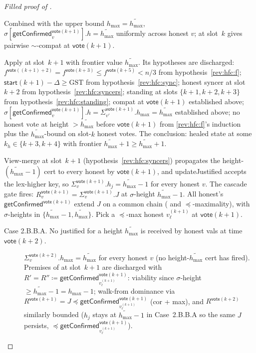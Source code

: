 \ifx\litemode\undefined\documentclass{article}\fi
\newcommand{\hmax}{\ensuremath{h_{\max}}\xspace}
\newcommand{\start}{\ensuremath{\mathsf{start}}}
\newcommand{\vote}{\ensuremath{\mathsf{vote}}}
\newcommand{\GST}{\ensuremath{\mathrm{GST}}\xspace}
\newcommand{\comm}[1]{\ensuremath{\widetilde{#1}}}
\newcommand{\updateJustified}{\textsf{updateJustified}\xspace}
\newcommand{\getConfirmed}{\textsf{getConfirmed}\xspace}
\theoremstyle{plain}
\theoremstyle{definition}
\theoremstyle{remark}
\begin{document}
\begin{proof}[Filled proof of ]
\begin{description}[style=nextline]
\begin{description}[style=nextline]
\begin{description}[style=nextline]
        Combined with the upper bound $\hmax = \comm{\hmax}$, $\sigma[\getConfirmed_v^{\vote(k+1)}].h = \comm{\hmax}$ uniformly across honest $v$;
         at slot~$k$ gives pairwise $\sim$-compat at $\vote(k+1)$.

        Apply  at slot~$k+1$ with frontier value $\comm{\hmax}$.
        Its hypotheses are discharged: $f^{\vote((k+1)+2)} = f^{\vote(k+3)} \leq f^{\vote(k+5)} < n/3$ from hypothesis~\ref{rev:hfc:f};
        $\start(k+1) - \Delta \geq \GST$ from hypothesis~\ref{rev:hfc:sync};
        honest syncer at slot~$k+2$ from hypothesis~\ref{rev:hfc:syncers};
        standing at slots $\{k+1, k+2, k+3\}$ from hypothesis~\ref{rev:hfc:standing};
        compat at $\vote(k+1)$ established above;
        $\sigma[\getConfirmed_v^{\vote(k+1)}].h = \Sigma_{v'}^{\vote(k+1)}.\hmax = \comm{\hmax}$ established above;
        no honest vote at height $> \comm{\hmax}$ before $\vote(k+1)$ from \ref{rev:hfc:f}'s induction plus the $\comm{\hmax}$-bound on slot-$k$ honest votes.
        The conclusion: healed state at some $k_h \in \{k+3, k+4\}$ with frontier $\comm{\hmax}+1 \geq \comm{\hmax}+1$.

      \item[Case 2.B.B. A justified for a height $\comm{\hmax}-1$ is received by honest vals at time $\vote(k+1)$.]
        View-merge at slot~$k+1$ (hypothesis~\ref{rev:hfc:syncers}) propagates the height-$(\comm{\hmax}-1)$ cert to every honest by $\vote(k+1)$, and \updateJustified{} accepts the lex-higher key, so $\Sigma_v^{\vote(k+1)}.h_j = \comm{\hmax}-1$ for every honest $v$.
        The cascade gate fires: $R_v^{\vote(k+1)} = \Sigma_v^{\vote(k+1)}.J$ at $\sigma$-height $\comm{\hmax}-1$.
        All honest's $\getConfirmed^{\vote(k+1)}$ extend $J$ on a common chain ( and $\preceq$-maximality), with $\sigma$-heights in $\{\comm{\hmax}-1, \comm{\hmax}\}$.
        Pick a $\preceq$-max honest $v_\ell^{(k+1)}$ at $\vote(k+1)$.

        \begin{description}
          \item[Case 2.B.B.A. No justified for a height $\comm{\hmax}$ is received by honest vals at time $\vote(k+2)$.]
            $\Sigma_v^{\vote(k+2)}.\hmax = \comm{\hmax}$ for every honest $v$ (no height-$\comm{\hmax}$ cert has fired).
            Premises of  at slot~$k+1$ are discharged with $R' = R'' \coloneqq \getConfirmed_{v_\ell^{(k+1)}}^{\vote(k+1)}$:
            viability since $\sigma$-height $\geq \comm{\hmax}-1 = \hmax-1$;
            walk-from dominance via $R^{\vote(k+1)} = J \preceq \getConfirmed_{v_\ell^{(k+1)}}^{\vote(k+1)}$ (cor + max), and $R^{\vote(k+2)}$ similarly bounded ($h_j$ stays at $\comm{\hmax}-1$ in Case~2.B.B.A so the same $J$ persists, $\preceq \getConfirmed_{v_\ell^{(k+1)}}^{\vote(k+1)}$).


\end{description}
\end{description}
\end{description}
\end{description}
\end{proof}
\end{document}
